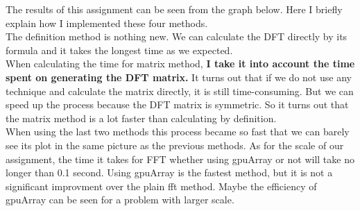 \documentclass[12pt,letterpaper]{article}
\begin{document}
The results of this assignment can be seen from the graph below.
Here I briefly explain how I implemented these four methods.\\
The definition method is nothing new. 
We can calculate the DFT directly by its formula and it takes the longest time as we expected.\\
When calculating the time for matrix method, \textbf{I take it into account the time spent on generating the DFT matrix.} 
It turns out that if we do not use any technique and calculate the matrix directly, it is still time-consuming.
But we can speed up the process because the DFT matrix is symmetric. 
So it turns out that the matrix method is a lot faster than calculating by definition.\\
When using the last two methods this process became so fast that we can barely see its plot in the same picture as the previous methods. 
As for the scale of our assignment, the time it takes for FFT whether using gpuArray or not will take no longer than 0.1 second.
Using gpuArray is the fastest method, but it is not a significant improvment over the plain fft method. 
Maybe the efficiency of gpuArray can be seen for a problem with larger scale.
\end{document}
